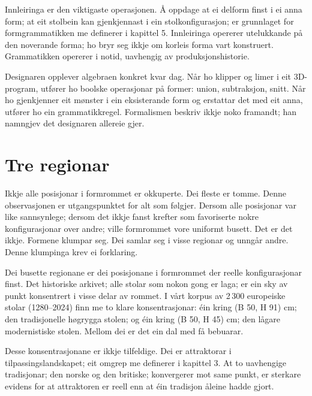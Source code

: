Innleiringa er den viktigaste operasjonen. Å oppdage at ei delform finst i ei anna form; at eit stolbein kan gjenkjennast i ein stolkonfigurasjon; er grunnlaget for formgrammatikken me definerer i kapittel 5. Innleiringa opererer utelukkande på den noverande forma; ho bryr seg ikkje om korleis forma vart konstruert. Grammatikken opererer i notid, uavhengig av produksjonshistorie.

Designaren opplever algebraen konkret kvar dag. Når ho klipper og limer i eit 3D-program, utfører ho boolske operasjonar på former: union, subtraksjon, snitt. Når ho gjenkjenner eit mønster i ein eksisterande form og erstattar det med eit anna, utfører ho ein grammatikkregel. Formalismen beskriv ikkje noko framandt; han namngjev det designaren allereie gjer.

\section*{Tre regionar}


Ikkje alle posisjonar i formrommet er okkuperte. Dei fleste er tomme. Denne observasjonen er utgangspunktet for alt som følgjer. Dersom alle posisjonar var like sannsynlege; dersom det ikkje fanst krefter som favoriserte nokre konfigurasjonar over andre; ville formrommet vore uniformt busett. Det er det ikkje. Formene klumpar seg. Dei samlar seg i visse regionar og unngår andre. Denne klumpinga krev ei forklaring.


Dei busette regionane er dei posisjonane i formrommet der reelle konfigurasjonar finst. Det historiske arkivet; alle stolar som nokon gong er laga; er ein sky av punkt konsentrert i visse delar av rommet. I vårt korpus av 2\,300 europeiske stolar (1280--2024) finn me to klare konsentrasjonar: éin kring (B  50, H  91) cm; den tradisjonelle høgrygga stolen; og éin kring (B  50, H  45) cm; den lågare modernistiske stolen. Mellom dei er det ein dal med få bebuarar.

Desse konsentrasjonane er ikkje tilfeldige. Dei er attraktorar i tilpassingslandskapet; eit omgrep me definerer i kapittel 3. At to uavhengige tradisjonar; den norske og den britiske; konvergerer mot same punkt, er sterkare evidens for at attraktoren er reell enn at éin tradisjon åleine hadde gjort.

